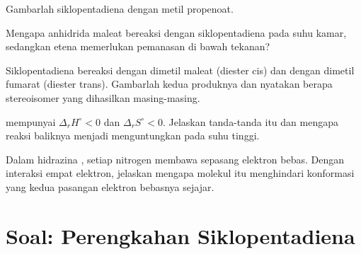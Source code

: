 \begin{exercise}[$\star\star$]\label{exo:b2:frontier-orbitals:8}
Gambarlah  siklopentadiena dengan metil propenoat.
\end{exercise}

\begin{exercise}[$\star\star$]\label{exo:b2:frontier-orbitals:9}
Mengapa anhidrida maleat bereaksi dengan siklopentadiena pada suhu kamar,
sedangkan etena memerlukan pemanasan di bawah tekanan?
\end{exercise}

\begin{exercise}[$\star\star\star$]\label{exo:b2:frontier-orbitals:10}
Siklopentadiena bereaksi dengan dimetil maleat (diester cis) dan dengan
dimetil fumarat (diester trans). Gambarlah kedua produknya dan nyatakan
berapa stereoisomer yang dihasilkan masing-masing.
\end{exercise}

\begin{exercise}[$\star\star\star$]\label{exo:b2:frontier-orbitals:11}
 mempunyai $\Delta_r H^\circ < 0$ dan $\Delta_r S^\circ < 0$.
Jelaskan tanda-tanda itu dan mengapa reaksi baliknya menjadi
menguntungkan pada suhu tinggi.
\end{exercise}

\begin{exercise}[$\star\star\star$]\label{exo:b2:frontier-orbitals:12}
Dalam hidrazina , setiap nitrogen membawa sepasang elektron
bebas. Dengan interaksi empat elektron, jelaskan mengapa molekul itu
menghindari konformasi yang kedua pasangan elektron bebasnya sejajar.
\end{exercise}

\section{Soal: Perengkahan Siklopentadiena}

